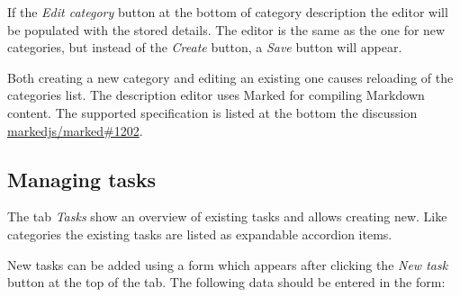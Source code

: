 If the \textit{Edit category} button at the bottom of category description the editor will be populated with the stored details. The editor is the same as the one for new categories, but instead of the \textit{Create} button, a \textit{Save} button will appear.

Both creating a new category and editing an existing one causes reloading of the categories list. The description editor uses Marked for compiling Markdown content. The supported specification is listed at the bottom the discussion \href{https://github.com/markedjs/marked/discussions/1202}{markedjs/marked\#1202}.

\subsection{Managing tasks}
\label{ssec:managing-tasks}

The tab \textit{Tasks} show an overview of existing tasks and allows creating new. Like categories the existing tasks are listed as expandable accordion items.


New tasks can be added using a form which appears after clicking the \textit{New task} button at the top of the tab. The following data should be entered in the form:


